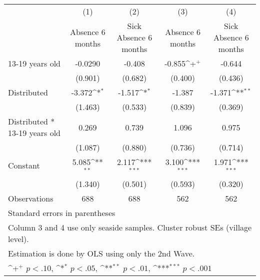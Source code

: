 {
\def\sym#1{\ifmmode^{#1}\else\(^{#1}\)\fi}
\begin{tabular}{l*{4}{c}}
\hline\hline
                    &\multicolumn{1}{c}{(1)}&\multicolumn{1}{c}{(2)}&\multicolumn{1}{c}{(3)}&\multicolumn{1}{c}{(4)}\\
                    &\multicolumn{1}{c}{Absence 6 months}&\multicolumn{1}{c}{Sick Absence 6 months}&\multicolumn{1}{c}{Absence 6 months}&\multicolumn{1}{c}{Sick Absence 6 months}\\
\hline
13-19 years old     &     -0.0290         &      -0.408         &      -0.855\sym{+}  &      -0.644         \\
                    &     (0.901)         &     (0.682)         &     (0.400)         &     (0.436)         \\
[1em]
Distributed         &      -3.372\sym{*}  &      -1.517\sym{*}  &      -1.387         &      -1.371\sym{**} \\
                    &     (1.463)         &     (0.533)         &     (0.839)         &     (0.369)         \\
[1em]
Distributed * 13-19 years old&       0.269         &       0.739         &       1.096         &       0.975         \\
                    &     (1.087)         &     (0.880)         &     (0.736)         &     (0.714)         \\
[1em]
Constant            &       5.085\sym{**} &       2.117\sym{***}&       3.100\sym{***}&       1.971\sym{***}\\
                    &     (1.340)         &     (0.501)         &     (0.593)         &     (0.320)         \\
\hline
Observations        &         688         &         688         &         562         &         562         \\
\hline\hline
\multicolumn{5}{l}{\footnotesize Standard errors in parentheses}\\
\multicolumn{5}{l}{\footnotesize Column 3 and 4 use only seaside samples. Cluster robust SEs (village level).}\\
\multicolumn{5}{l}{\footnotesize Estimation is done by OLS using only the 2nd Wave.}\\
\multicolumn{5}{l}{\footnotesize \sym{+} \(p<.10\), \sym{*} \(p<.05\), \sym{**} \(p<.01\), \sym{***} \(p<.001\)}\\
\end{tabular}
}
